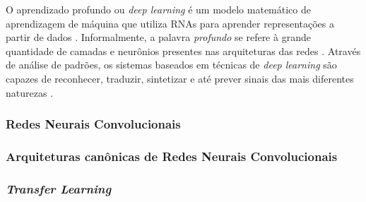 O aprendizado profundo ou \emph{deep learning} é um modelo matemático de aprendizagem de máquina que utiliza RNAs para aprender representações a partir de dados \cite{ref:chollet, ref:buduma}. Informalmente, a palavra \emph{profundo} se refere à grande quantidade de camadas e neurônios presentes nas arquiteturas das redes \cite{ref:gulli}. Através de análise de padrões, os sistemas baseados em técnicas de \emph{deep learning} são capazes de reconhecer, traduzir, sintetizar e até prever sinais das mais diferentes naturezas \cite{ref:JAI-2017}.

\subsubsection{Redes Neurais Convolucionais}


\subsubsection{Arquiteturas canônicas de Redes Neurais Convolucionais}


\subsubsection{\textit{Transfer Learning}}
